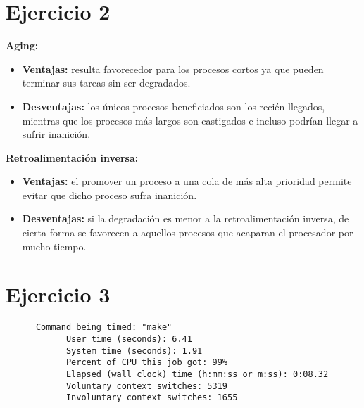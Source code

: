 \documentclass[11pt]{article}
\begin{document}
\section*{Ejercicio 2}

\textbf{Aging:}

\begin{itemize}
    \item \textbf{Ventajas:} resulta favorecedor para los procesos cortos ya que
          pueden terminar sus tareas sin ser degradados.
    \item \textbf{Desventajas:} los únicos procesos beneficiados son los recién llegados,
          mientras que los procesos más largos son castigados e incluso podrían llegar
          a sufrir inanición.
\end{itemize}

\textbf{Retroalimentación inversa:}

\begin{itemize}
    \item \textbf{Ventajas:} el promover un proceso a una cola de más alta prioridad
          permite evitar que dicho proceso sufra inanición.
    \item \textbf{Desventajas:} si la degradación es menor a la retroalimentación inversa,
          de cierta forma se favorecen a aquellos procesos que acaparan el procesador por 
          mucho tiempo.
\end{itemize}

\section*{Ejercicio 3}

\begin{verbatim}
      Command being timed: "make"
            User time (seconds): 6.41
            System time (seconds): 1.91
            Percent of CPU this job got: 99%
            Elapsed (wall clock) time (h:mm:ss or m:ss): 0:08.32
            Voluntary context switches: 5319
            Involuntary context switches: 1655
\end{verbatim}
\end{document}
